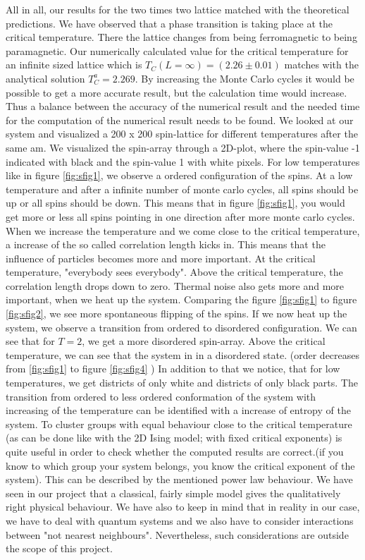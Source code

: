 \documentclass[10pt,a4paper]{article}
\begin{document}
All in all, our results for the two times two lattice matched with the theoretical predictions. 
We have observed that a phase transition is taking place at the critical temperature. There the lattice changes from being ferromagnetic to being paramagnetic.
Our numerically calculated value for the critical temperature for an infinite sized lattice which is $T_C(L = \infty) = (2.26 \pm 0.01)$ matches with the analytical solution $T_C^{a} = 2.269$. By increasing the Monte Carlo cycles it would be possible to get a more accurate result, but the calculation time would increase. Thus a balance between the accuracy of the numerical result and the needed time for the computation of the numerical result needs to be found.
We looked at our system and visualized a 200 x 200 spin-lattice for different temperatures after the same am. We visualized the spin-array through a 2D-plot, where the spin-value -1 indicated with black and the spin-value 1 with white pixels. For low temperatures like in figure \ref{fig:sfig1}, we observe a ordered configuration of the spins. At a low temperature and after a infinite number of monte carlo cycles, all spins should be up or all spins should be down. This means that in figure \ref{fig:sfig1}, you would get more or less all spins pointing in one direction after more monte carlo cycles.  When we increase the temperature and we come close to the critical temperature, a increase of the so called correlation length kicks in. This means that the influence of particles becomes more and more important. At the critical temperature, "everybody sees everybody". Above the critical temperature, the correlation length drops down to zero.  
Thermal noise also gets more and more important, when we heat up the system. Comparing the figure \ref{fig:sfig1} to figure \ref{fig:sfig2}, we see more spontaneous flipping of the spins. 
If we now heat up the system, we observe a transition from ordered to disordered configuration. We can see that for $T=2$, we get a more disordered spin-array. Above the critical temperature, we can see that the system in in a disordered state. (order decreases from \ref{fig:sfig1} to figure \ref{fig:sfig4} ) 
In addition to that we notice, that for low temperatures, we get districts of only white and districts of only black parts. 
The transition from ordered to less ordered conformation of the system with increasing of the temperature can be identified with a increase of entropy of the system. 
To cluster groups with equal behaviour close to the critical temperature (as can be done like with the 2D Ising model; with fixed critical exponents) is quite useful in order to check whether the computed results are correct.(if you know to which group your system belongs, you know the critical exponent of the system). This can be described by the mentioned power law behaviour. 
We have seen in our project that a classical, fairly simple model gives the qualitatively right physical behaviour. We have also to keep in mind that in reality in our case, we have to deal with quantum systems and we also have to consider interactions between "not nearest neighbours".
Nevertheless, such considerations are outside the scope of this project.
\end{document}
